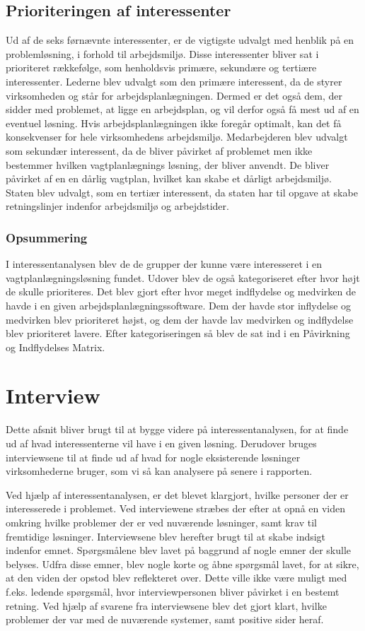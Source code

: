 \subsection{Prioriteringen af interessenter}
Ud af de seks førnævnte interessenter, er de vigtigste udvalgt med henblik på en problemløsning, i forhold til arbejdsmiljø. Disse interessenter bliver sat i prioriteret rækkefølge, som henholdsvis primære, sekundære og tertiære interessenter. Lederne blev udvalgt som den primære interessent, da de styrer virksomheden og står for arbejdsplanlægningen. Dermed er det også dem, der sidder med problemet, at ligge en arbejdsplan, og vil derfor også få mest ud af en eventuel løsning. Hvis arbejdsplanlægningen ikke foregår optimalt, kan det få konsekvenser for hele virksomhedens arbejdsmiljø. Medarbejderen blev udvalgt som sekundær interessent, da de bliver påvirket af problemet men ikke bestemmer hvilken vagtplanlægnings løsning, der bliver anvendt. De bliver påvirket af en en dårlig vagtplan, hvilket kan skabe et dårligt arbejdsmiljø. Staten blev udvalgt, som en tertiær interessent, da staten har til opgave at skabe retningslinjer indenfor arbejdsmiljø og arbejdstider.

\subsubsection{Opsummering}
I interessentanalysen blev de de grupper der kunne være interesseret i en vagtplanlægningsløsning fundet. Udover blev de også kategoriseret efter hvor højt de skulle prioriteres. Det blev gjort efter hvor meget indflydelse og medvirken de havde i en given arbejdsplanlægningssoftware. Dem der havde stor inflydelse og medvirken blev prioriteret højst, og dem der havde lav medvirken og indflydelse blev prioriteret lavere. Efter kategoriseringen så blev de sat ind i en Påvirkning og Indflydelses Matrix.

\section{Interview}
Dette afsnit bliver brugt til at bygge videre på interessentanalysen, for at finde ud af hvad interessenterne vil have i en given løsning. Derudover bruges interviewsene til at finde ud af hvad for nogle eksisterende løsninger virksomhederne bruger, som vi så kan analysere på senere i rapporten. 

Ved hjælp af interessentanalysen, er det blevet klargjort, hvilke personer der er interesserede i problemet. Ved interviewene stræbes der efter at opnå en viden omkring hvilke problemer der er ved nuværende løsninger, samt krav til fremtidige løsninger. Interviewsene blev herefter brugt til at skabe indsigt indenfor emnet. Spørgsmålene blev lavet på baggrund af nogle emner der skulle belyses. Udfra disse emner, blev nogle korte og åbne spørgsmål lavet, for at sikre, at den viden der opstod blev reflekteret over. Dette ville ikke være muligt med f.eks. ledende spørgsmål, hvor interviewpersonen bliver påvirket i en bestemt retning. Ved hjælp af svarene fra interviewsene blev det gjort klart, hvilke problemer der var med de nuværende systemer, samt positive sider heraf. %

